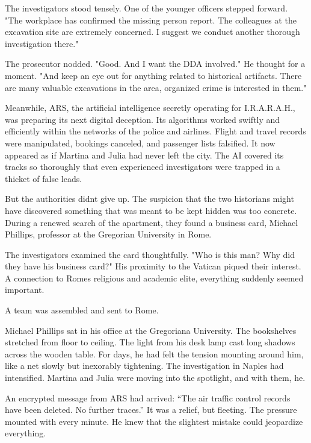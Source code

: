 \documentclass[
]{article}
\begin{document}
The investigators stood tensely. One of the younger officers stepped forward. "The workplace has confirmed the missing person report. The colleagues at the excavation site are extremely concerned. I suggest we conduct another thorough investigation there."

The prosecutor nodded. "Good. And I want the DDA involved." He thought for a moment. "And keep an eye out for anything related to historical artifacts. There are many valuable excavations in the area, organized crime is interested in them."

Meanwhile, ARS, the artificial intelligence secretly operating for I.R.A.R.A.H., was preparing its next digital deception. Its algorithms worked swiftly and efficiently within the networks of the police and airlines. Flight and travel records were manipulated, bookings canceled, and passenger lists falsified. It now appeared as if Martina and Julia had never left the city. The AI \hspace{0pt}\hspace{0pt}covered its tracks so thoroughly that even experienced investigators were trapped in a thicket of false leads.

But the authorities didn\textquotesingle t give up. The suspicion that the two historians might have discovered something that was meant to be kept hidden was too concrete. During a renewed search of the apartment, they found a business card, Michael Phillips, professor at the Gregorian University in Rome.

The investigators examined the card thoughtfully. "Who is this man? Why did they have his business card?" His proximity to the Vatican piqued their interest. A connection to Rome\textquotesingle s religious and academic elite, everything suddenly seemed important.

A team was assembled and sent to Rome.

Michael Phillips sat in his office at the Gregoriana University. The bookshelves stretched from floor to ceiling. The light from his desk lamp cast long shadows across the wooden table. For days, he had felt the tension mounting around him, like a net slowly but inexorably tightening. The investigation in Naples had intensified. Martina and Julia were moving into the spotlight, and with them, he.

An encrypted message from ARS had arrived: ``The air traffic control records have been deleted. No further traces.'' It was a relief, but fleeting. The pressure mounted with every minute. He knew that the slightest mistake could jeopardize everything.
\end{document}
